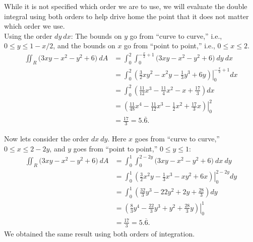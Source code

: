 {While it is not specified which order we are to use, we will evaluate the double integral using both orders to help drive home the point that it does not matter which order we use.\\

Using the order $dy\ dx$:
The bounds on $y$ go from ``curve to curve,'' i.e., $0\leq y\leq 1-x/2$, and the bounds on $x$ go from ``point to point,'' i.e., $0\leq x\leq 2$.
\begin{align*}
\iint_R (3xy-x^2-y^2+6\big)\ dA &= \int_0^2\int_0^{-\frac x2+1} (3xy-x^2-y^2+6\big)\ dy\ dx\\
		&= \int_0^2\left.\left(\frac32xy^2-x^2y-\frac13y^3+6y\right)\right|_0^{-\frac x2+1}dx\\
		&= \int_0^2 \left(\frac{11}{12}x^3-\frac{11}{4}x^2-x+\frac{17}3\right)dx \\
		&= \left.\left(\frac{11}{48}x^4-\frac{11}{12}x^3-\frac12x^2+\frac{17}3x\right)\right|_0^2\\
		&= \frac{17}3=5.\overline{6}.
\end{align*}

Now lets consider the order $dx \ dy$. Here $x$ goes from ``curve to curve,'' $0\leq x\leq 2-2y$, and $y$ goes from ``point to point,'' $0\leq y\leq 1$:
\begin{align*}
\iint_R (3xy-x^2-y^2+6\big)\ dA &= \int_0^1\int_0^{2-2y} (3xy-x^2-y^2+6\big)\ dx\ dy\\
		&= \int_0^1\left.\left(\frac32x^2y-\frac13x^3-xy^2+6x\right)\right|_0^{2-2y} dy\\
		&= \int_0^1\left(\frac{32}3y^3-22y^2+2y+\frac{28}3\right)dy\\
		&=\left.\left(\frac83y^4-\frac{22}3y^3+y^2+\frac{28}3y\right)\right|_0^1\\
		&=\frac{17}3=5.\overline{6}.
\end{align*}
We obtained the same result using both orders of integration.}

